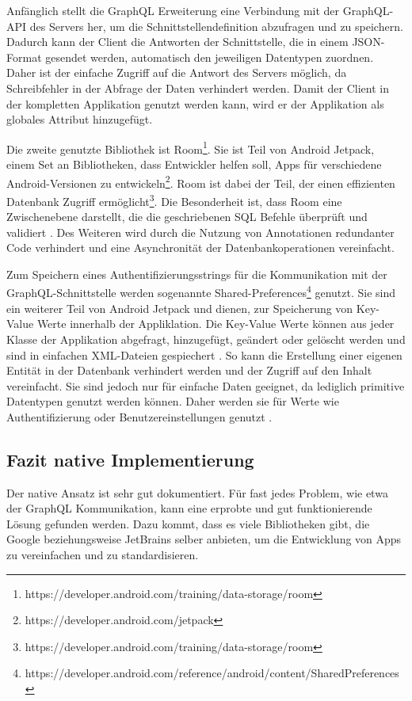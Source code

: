 Anfänglich stellt die GraphQL Erweiterung eine Verbindung mit der GraphQL-API des Servers her, um die Schnittstellendefinition abzufragen und zu speichern. Dadurch kann der Client die Antworten der Schnittstelle, die in einem JSON-Format gesendet werden, automatisch den jeweiligen Datentypen zuordnen. Daher ist der einfache Zugriff auf die Antwort des Servers möglich, da Schreibfehler in der Abfrage der Daten verhindert werden.
Damit der Client in der kompletten Applikation genutzt werden kann, wird er der Applikation als globales Attribut hinzugefügt.

Die zweite genutzte Bibliothek ist Room\footnote{https://developer.android.com/training/data-storage/room}. Sie ist Teil von Android Jetpack, einem Set an Bibliotheken, dass Entwickler helfen soll, Apps für verschiedene Android-Versionen zu entwickeln\footnote{https://developer.android.com/jetpack}. Room ist dabei der Teil, der einen effizienten Datenbank Zugriff ermöglicht\footnote{https://developer.android.com/training/data-storage/room}.
Die Besonderheit ist, dass Room eine Zwischenebene darstellt, die die geschriebenen SQL Befehle überprüft und validiert \cite{Android_Room}. Des Weiteren wird durch die Nutzung von Annotationen redundanter Code verhindert und eine Asynchronität der Datenbankoperationen vereinfacht.

Zum Speichern eines Authentifizierungsstrings für die Kommunikation mit der GraphQL-Schnittstelle werden sogenannte Shared-Preferences\footnote{https://developer.android.com/reference/android/content/SharedPreferences} genutzt. 
Sie sind ein weiterer Teil von Android Jetpack und dienen, zur Speicherung von Key-Value Werte innerhalb der Appliklation. 
Die Key-Value Werte können aus jeder Klasse der Applikation abgefragt, hinzugefügt, geändert oder gelöscht werden und sind in einfachen XML-Dateien gespiechert \cite{Shared_Preferences_Android}. 
So kann die Erstellung einer eigenen Entität in der Datenbank verhindert werden und der Zugriff auf den Inhalt vereinfacht. 
Sie sind jedoch nur für einfache Daten geeignet, da lediglich primitive Datentypen genutzt werden können. 
Daher werden sie für Werte wie Authentifizierung oder Benutzereinstellungen genutzt \cite{Shared_Preferences_Android}.


\subsection{Fazit native Implementierung}
Der native Ansatz ist sehr gut dokumentiert. Für fast jedes Problem, wie etwa der GraphQL Kommunikation, kann eine erprobte und gut funktionierende Lösung gefunden werden. Dazu kommt, dass es viele Bibliotheken gibt, die Google beziehungsweise JetBrains selber anbieten, um die Entwicklung von Apps zu vereinfachen und zu standardisieren.


